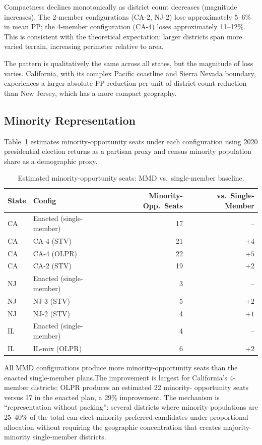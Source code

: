 Compactness declines monotonically as district count decreases (magnitude
increases).  The 2-member configurations (CA-2, NJ-2) lose approximately
5--6\% in mean PP; the 4-member configuration (CA-4) loses approximately
11--12\%.  This is consistent with the theoretical expectation: larger
districts span more varied terrain, increasing perimeter relative to area.

The pattern is qualitatively the same across all states, but the magnitude of
loss varies.  California, with its complex Pacific coastline and Sierra Nevada
boundary, experiences a larger absolute PP reduction per unit of district-count
reduction than New Jersey, which has a more compact geography.

\subsection{Minority Representation}

Table~\ref{tab:mmd-minority} estimates minority-opportunity seats under each
configuration using 2020 presidential election returns as a partisan proxy
and census minority population share as a demographic proxy.

\begin{table}[ht]
\centering
\caption{Estimated minority-opportunity seats: MMD vs.\ single-member
  baseline.\singrun}
\label{tab:mmd-minority}
\begin{tabular}{llrr}
\toprule
State & Config & Minority-Opp.\ Seats & vs.\ Single-Member \\
\midrule
CA & Enacted (single-member) & 17 & -- \\
CA & CA-4 (STV)              & 21 & $+4$ \\
CA & CA-4 (OLPR)             & 22 & $+5$ \\
CA & CA-2 (STV)              & 19 & $+2$ \\
\midrule
NJ & Enacted (single-member) &  3 & -- \\
NJ & NJ-3 (STV)              &  5 & $+2$ \\
NJ & NJ-2 (STV)              &  4 & $+1$ \\
\midrule
IL & Enacted (single-member) &  4 & -- \\
IL & IL-mix (OLPR)           &  6 & $+2$ \\
\bottomrule
\end{tabular}
\end{table}

All MMD configurations produce more minority-opportunity seats than the
enacted single-member plans.\singrun  The improvement is largest for
California's 4-member districts: OLPR produces an estimated 22 minority-
opportunity seats versus 17 in the enacted plan, a 29\% improvement.  The
mechanism is ``representation without packing'': several districts where
minority populations are 25--40\% of the total can elect minority-preferred
candidates under proportional allocation without requiring the geographic
concentration that creates majority-minority single-member districts.

